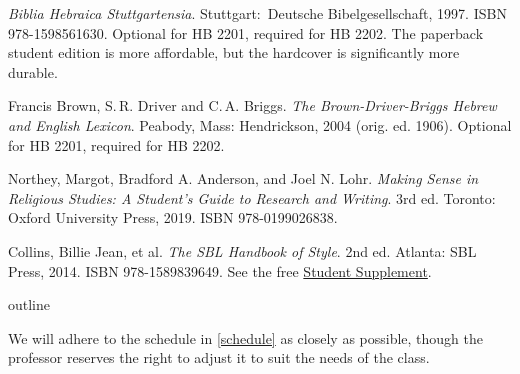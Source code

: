 \documentclass[titlepage]{article}
\begin{document}
\begingroup
\renewcommand{\section}[2]{}%
\begin{thebibliography}{Making Sense}%

    \emph{Biblia Hebraica Stuttgartensia}.
    Stuttgart: Deutsche Bibel\-ge\-sell\-schaft, 1997. ISBN 978-1598561630.
    Optional for HB 2201, required for HB 2202. The paperback student
    edition is more affordable, but the hardcover is significantly more
    durable.
    
    Francis Brown, S.\,R. Driver and C.\,A. Briggs. \emph{The
    Brown-Driver-Briggs Hebrew and English Lexicon}. Peabody, Mass:
    Hendrickson, 2004 (orig. ed. 1906).
    Optional for HB 2201, required for HB 2202.

	 Northey, Margot, Bradford A. Anderson, and Joel N. Lohr.
	\emph{Making Sense in Religious Studies: A Student's Guide to Research and Writing}.
	3rd ed. Toronto: Oxford University Press, 2019. ISBN 978-0199026838.

	 Collins, Billie Jean, et al.
	\emph{The SBL Handbook of Style}.
	2nd ed. Atlanta: SBL Press, 2014. ISBN 978-1589839649. See the free
	\href{https://www.sbl-site.org/assets/pdfs/pubs/SBLHSsupp2015-02.pdf}{Student Supplement}.

\end{thebibliography}
\endgroup

\section{Course Outline}
\label{outline}

We will adhere to the schedule in \autoref{schedule} as closely as
possible, though the professor reserves the right to adjust it to suit
the needs of the class.
\end{document}
